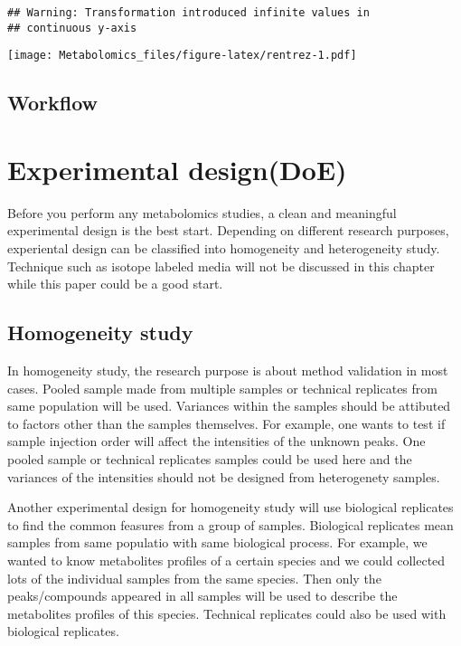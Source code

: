 \documentclass[
]{book}
\begin{document}
\begin{verbatim}
## Warning: Transformation introduced infinite values in
## continuous y-axis
\end{verbatim}

\texttt{[image: Metabolomics\_files/figure-latex/rentrez-1.pdf]}

\hypertarget{workflow-1}{%
\section{Workflow}\label{workflow-1}}

\hypertarget{htmlwidget-26a18921f7f69567778e}{}

\hypertarget{experimental-designdoe}{%
\chapter{Experimental design(DoE)}\label{experimental-designdoe}}

Before you perform any metabolomics studies, a clean and meaningful experimental design is the best start. Depending on different research purposes, experiental design can be classified into homogeneity and heterogeneity study. Technique such as isotope labeled media will not be discussed in this chapter while this paper\citep{jang2018} could be a good start.

\hypertarget{homogeneity-study}{%
\section{Homogeneity study}\label{homogeneity-study}}

In homogeneity study, the research purpose is about method validation in most cases. Pooled sample made from multiple samples or technical replicates from same population will be used. Variances within the samples should be attibuted to factors other than the samples themselves. For example, one wants to test if sample injection order will affect the intensities of the unknown peaks. One pooled sample or technical replicates samples could be used here and the variances of the intensities should not be designed from heterogenety samples.

Another experimental design for homogeneity study will use biological replicates to find the common feasures from a group of samples. Biological replicates mean samples from same populatio with same biological process. For example, we wanted to know metabolites profiles of a certain species and we could collected lots of the individual samples from the same species. Then only the peaks/compounds appeared in all samples will be used to describe the metabolites profiles of this species. Technical replicates could also be used with biological replicates.
\end{document}
